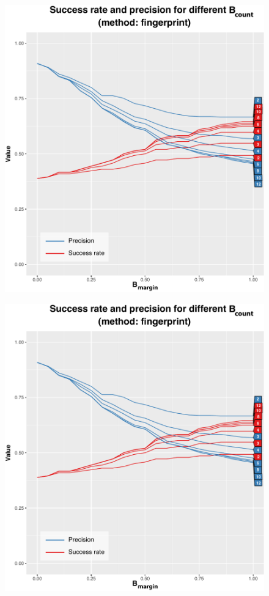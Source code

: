 \documentclass[thesis.tex]{subfiles}
\begin{document}
\begin{figure}[h]
\centering \includegraphics[page=1,width=\textwidth,height=\textheight,keepaspectratio=true]{images/experiment/match_precision}
\end{figure}
\begin{figure}[h]
\centering \includegraphics[page=2,width=\textwidth,height=\textheight,keepaspectratio=true]{images/experiment/match_precision}
\end{figure}
\end{document}
